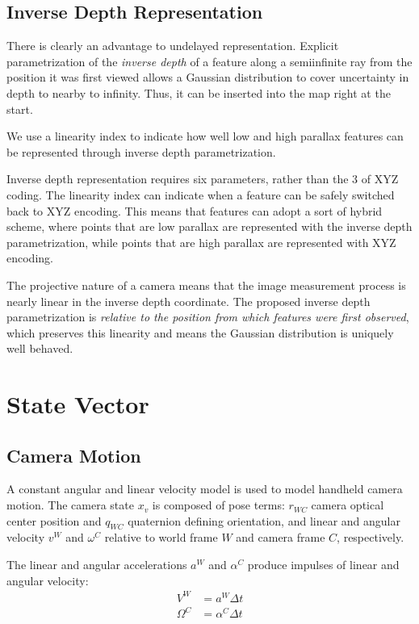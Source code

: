 \documentclass[twoside]{article}
\begin{document}
\subsection*{Inverse Depth Representation}
There is clearly an advantage to undelayed representation. Explicit parametrization of the \textit{inverse depth} of a feature along a semiinfinite ray from the position it was first viewed allows a Gaussian distribution to cover uncertainty in depth to nearby to infinity. Thus, it can be inserted into the map right at the start.

We use a linearity index to indicate how well low and high parallax features can be represented through inverse depth parametrization.

Inverse depth representation requires six parameters, rather than the 3 of XYZ coding. The linearity index can indicate when a feature can be safely switched back to XYZ encoding. This means that features can adopt a sort of hybrid scheme, where points that are low parallax are represented with the inverse depth parametrization, while points that are high parallax are represented with XYZ encoding.

The projective nature of a camera means that the image measurement process is nearly linear in the inverse depth coordinate. The proposed inverse depth parametrization is \textit{relative to the position from which features were first observed}, which preserves this linearity and means the Gaussian distribution is uniquely well behaved.

\section{State Vector}

\subsection*{Camera Motion}

A constant angular and linear velocity model is used to model handheld camera motion. The camera state $x_v$ is composed of pose terms: $r_{WC}$ camera optical center position and $q_{WC}$ quaternion defining orientation, and linear and angular velocity $v^W$ and $\omega^C$ relative to world frame $W$ and camera frame $C$, respectively.

The linear and angular accelerations $a^W$ and $\alpha^C$ produce impulses of linear and angular velocity:
\begin{equation}
\begin{split}
V^W &= a^W\Delta t \\
\Omega^C &= \alpha^C \Delta t \\
\end{split}
\end{equation}
\end{document}
